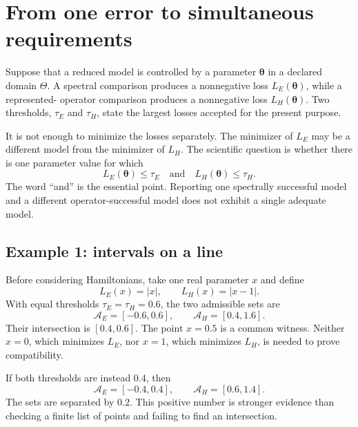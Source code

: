 \section{From one error to simultaneous requirements}

Suppose that a reduced model is controlled by a parameter
$\boldsymbol\theta$ in a declared domain $\Theta$. A spectral comparison
produces a nonnegative loss $L_E(\boldsymbol\theta)$, while a represented-
operator comparison produces a nonnegative loss $L_H(\boldsymbol\theta)$. Two
thresholds, $\tau_E$ and $\tau_H$, state the largest losses accepted for the
present purpose.

It is not enough to minimize the losses separately. The minimizer of $L_E$ may
be a different model from the minimizer of $L_H$. The scientific question is
whether there is one parameter value for which
\begin{equation}
  L_E(\boldsymbol\theta)\leq\tau_E
  \quad\text{and}\quad
  L_H(\boldsymbol\theta)\leq\tau_H.
\end{equation}
The word ``and'' is the essential point. Reporting one spectrally successful
model and a different operator-successful model does not exhibit a single
adequate model.

\subsection{Example 1: intervals on a line}

Before considering Hamiltonians, take one real parameter $x$ and define
\begin{equation}
  L_E(x)=|x|,
  \qquad
  L_H(x)=|x-1|.
\end{equation}
With equal thresholds $\tau_E=\tau_H=0.6$, the two admissible sets are
\begin{equation}
  \mathcal A_E=[-0.6,0.6],
  \qquad
  \mathcal A_H=[0.4,1.6].
\end{equation}
Their intersection is $[0.4,0.6]$. The point $x=0.5$ is a common witness.
Neither $x=0$, which minimizes $L_E$, nor $x=1$, which minimizes $L_H$, is
needed to prove compatibility.

If both thresholds are instead $0.4$, then
\begin{equation}
  \mathcal A_E=[-0.4,0.4],
  \qquad
  \mathcal A_H=[0.6,1.4].
\end{equation}
The sets are separated by $0.2$. This positive number is stronger evidence
than checking a finite list of points and failing to find an intersection.

